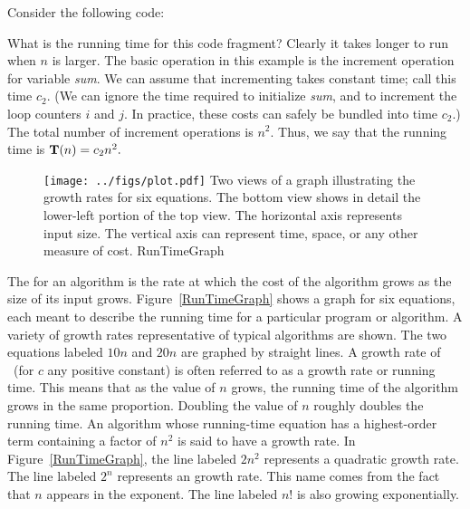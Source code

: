 \begin{example}
Consider the following code:


What is the running time for this code fragment?
Clearly it takes longer to run when \(n\) is larger.
The basic operation in this example is the
increment operation for variable \emph{sum}.
We can assume that incrementing takes constant time;
call this time \(c_2\).
(We can ignore the time required to initialize \emph{sum}, and to
increment the loop counters \(i\) and \(j\).
In practice, these costs can safely be bundled into time \(c_2\).)
The total number of increment operations is \(n^2\).
Thus, we say that the running time is
\(\mbox{$\textbf{T}(n)$} = c_2 n^2.\)
\end{example}


\begin{figure}
\texttt{[image: ../figs/plot.pdf]}
{Two views of a graph illustrating the growth rates for
six equations.
The bottom view shows in detail the lower-left portion
of the top view.
The horizontal axis represents input size.
The vertical axis can represent time, space, or any other measure of
cost.}
{RunTimeGraph}
\bigskip
\end{figure}

The  for an algorithm is the rate at which the cost 
of the algorithm grows as the size of its input grows.
Figure~\ref{RunTimeGraph} shows a graph for six equations, each meant
to describe the running time for a particular program or algorithm.
A variety of growth rates representative of typical
algorithms are shown.
The two equations labeled \(10n\) and \(20n\) are graphed by straight
lines.
A growth rate of \cn\ (for \(c\) any positive constant) is
often referred to as a
 growth rate or running time. 
This means that as the value of \(n\) grows, the running time of the
algorithm grows in the same proportion.
Doubling the value of \(n\) roughly doubles the running time.
An algorithm whose running-time equation has a highest-order term
containing a factor of \(n^2\) is said to have a 
growth rate.
In Figure~\ref{RunTimeGraph}, the line labeled \(2n^2\) represents a
quadratic growth rate.
The line labeled \(2^n\) represents an 
growth rate.
This name comes from the fact that \(n\) appears in the exponent.
The line labeled \(n!\) is also growing exponentially.

